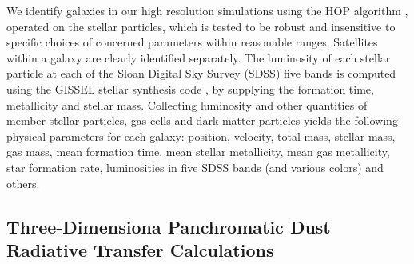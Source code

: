 We identify galaxies in our high resolution simulations using the HOP algorithm 
\citep[][]{1999Eisenstein}, operated on the stellar particles, which is tested to be robust
and insensitive to specific choices of concerned parameters within reasonable ranges.
Satellites within a galaxy are clearly identified separately.
The luminosity of each stellar particle at each of the Sloan Digital Sky Survey (SDSS) five bands 
is computed using the GISSEL stellar synthesis code \citep[][]{Bruzual03}, 
by supplying the formation time, metallicity and stellar mass.
Collecting luminosity and other quantities of member stellar particles, gas cells and dark matter 
particles yields
the following physical parameters for each galaxy:
position, velocity, total mass, stellar mass, gas mass, 
mean formation time, 
mean stellar metallicity, mean gas metallicity,
star formation rate,
luminosities in five SDSS bands (and various colors) and others.

\subsection{Three-Dimensiona Panchromatic Dust Radiative Transfer Calculations}


